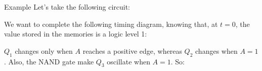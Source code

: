 \documentclass[a4paper]{article}
\begin{document}
\begin{parag}{Example}
    Let's take the following circuit:

    We want to complete the following timing diagram, knowing that, at $t = 0$, the value stored in the memories is a logic level 1: 

    $Q_1$ changes only when $A$ reaches a positive edge, whereas $Q_2$ changes when $A = 1$. Also, the NAND gate make $Q_3$ oscillate when $A = 1$. So:

\end{parag}
\end{document}
